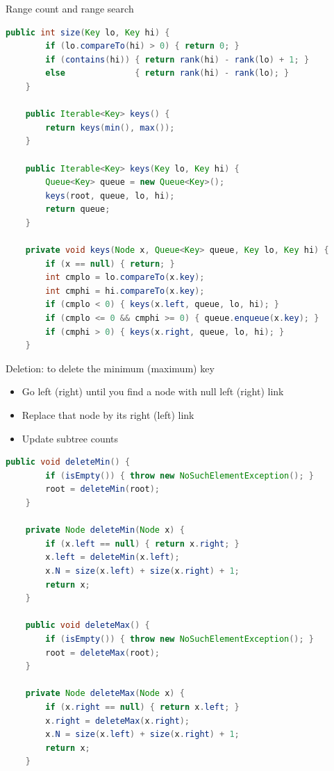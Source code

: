 \documentclass[8pt,a4paper,compress]{beamer}
\begin{document}
\begin{frame}[fragile]
\pause

Range count and range search
\begin{lstlisting}[language=Java]
    public int size(Key lo, Key hi) {
        if (lo.compareTo(hi) > 0) { return 0; }
        if (contains(hi)) { return rank(hi) - rank(lo) + 1; }
        else              { return rank(hi) - rank(lo); }
    }

    public Iterable<Key> keys() {
        return keys(min(), max());
    }

    public Iterable<Key> keys(Key lo, Key hi) {
        Queue<Key> queue = new Queue<Key>();
        keys(root, queue, lo, hi);
        return queue;
    } 

    private void keys(Node x, Queue<Key> queue, Key lo, Key hi) { 
        if (x == null) { return; }
        int cmplo = lo.compareTo(x.key); 
        int cmphi = hi.compareTo(x.key); 
        if (cmplo < 0) { keys(x.left, queue, lo, hi); } 
        if (cmplo <= 0 && cmphi >= 0) { queue.enqueue(x.key); }
        if (cmphi > 0) { keys(x.right, queue, lo, hi); }
    } 
\end{lstlisting}
\end{frame}

\begin{frame}[fragile]
\pause

Deletion: to delete the minimum (maximum) key
\begin{itemize}
\item Go left (right) until you find a node with null left (right) link
\item Replace that node by its right (left) link
\item Update subtree counts
\end{itemize}

\pause

\begin{lstlisting}[language=Java]
    public void deleteMin() {
        if (isEmpty()) { throw new NoSuchElementException(); }
        root = deleteMin(root);
    }

    private Node deleteMin(Node x) {
        if (x.left == null) { return x.right; }
        x.left = deleteMin(x.left);
        x.N = size(x.left) + size(x.right) + 1; 
        return x;
    }

    public void deleteMax() {
        if (isEmpty()) { throw new NoSuchElementException(); }
        root = deleteMax(root);
    }

    private Node deleteMax(Node x) {
        if (x.right == null) { return x.left; }
        x.right = deleteMax(x.right);
        x.N = size(x.left) + size(x.right) + 1;
        return x;
    }   
\end{lstlisting}
\end{frame}
\end{document}
